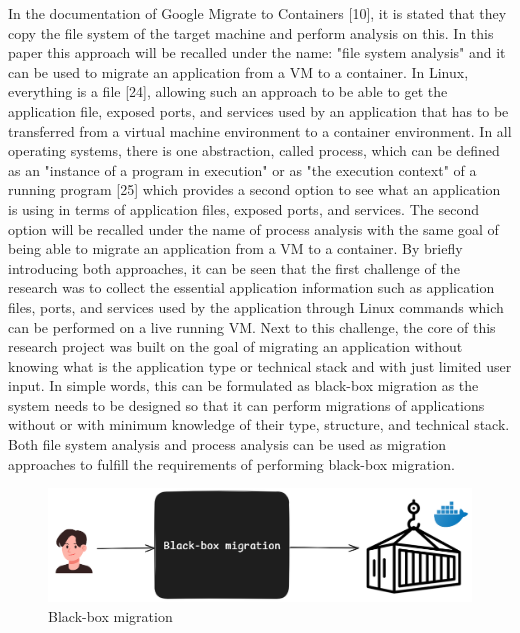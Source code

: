 \documentclass{article}
\begin{document}
\begin{multicols}{2}
In the documentation of Google Migrate to Containers [10], it is stated that they copy the file system of the target machine and perform analysis on this. In this paper this approach will be recalled under the name: "file system analysis" and it can be used to migrate an application from a VM to a container. In Linux, everything is a file [24], allowing such an approach to be able to get the application file, exposed ports, and services used by an application that has to be transferred from a virtual machine environment to a container environment. In all operating systems, there is one abstraction, called process, which can be defined as an "instance of a program in execution" or as "the execution context" of a running program [25] which provides a second option to see what an application is using in terms of application files, exposed ports, and services. The second option will be recalled under the name of process analysis with the same goal of being able to migrate an application from a VM to a container. By briefly introducing both approaches, it can be seen that the first challenge of the research was to collect the essential application information such as application files, ports, and services used by the application through Linux commands which can be performed on a live running VM. Next to this challenge, the core of this research project was built on the goal of migrating an application without knowing what is the application type or technical stack and with just limited user input. In simple words, this can be formulated as black-box migration as the system needs to be designed so that it can perform migrations of applications without or with minimum knowledge of their type, structure, and technical stack. Both file system analysis and process analysis can be used as migration approaches to fulfill the requirements of performing black-box migration.

\begin{figure}[H]
    \centering
    \includegraphics[width=\linewidth]{images/black-box-migration.png}
    \caption{Black-box migration}
    \label{fig:black_box_migration}
\end{figure}


\end{multicols}
\end{document}
